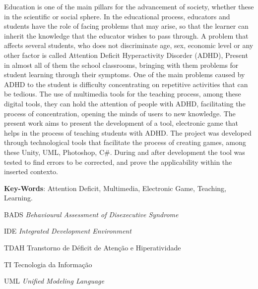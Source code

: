 \documentclass[
	12pt,				%
    oneside,			%
	a4paper,			%
	english,			%
	french,				%
	spanish,			%
	brazil,				%
	]{abntex2}
\begin{document}
\begin{resumo}[Abstract]
	
	Education is one of the main pillars for the advancement of society, whether these in the scientific or social sphere. In the educational process, educators and students have the role of facing problems that may arise, so that the learner can inherit the knowledge that the educator wishes to pass through. A problem that affects several students, who does not discriminate age, sex, economic level or any other factor is called Attention Deficit Hyperactivity Disorder (ADHD), Present in almost all of them the school classrooms, bringing with them problems for student learning through their symptoms. One of the main problems caused by ADHD to the student is difficulty concentrating on repetitive activities that can be tedious. The use of multimedia tools for the teaching process, among these digital tools, they can hold the attention of people with ADHD, facilitating the process of concentration, opening the minds of users to new knowledge. The present work aims to present the development of a tool, electronic game that helps in the process of teaching students with ADHD. The project was developed through technological tools that facilitate the process of creating games, among these Unity, UML, Photoshop, C\#. During and after development the tool was tested to find errors to be corrected, and prove the applicability within the inserted contexto.
	\vspace{\onelineskip}
	
	\noindent
	\textbf{Key-Words}: Attention Deficit, Multimedia, Electronic Game, Teaching, Learning.

\end{resumo}



\listoffigures* %
\cleardoublepage %


\listoftables*
\cleardoublepage

\begin{siglas}
	\item[BADS] \textit{Behavioural Assessment of Disexecutive Syndrome}
	\item[IDE] \textit{Integrated Development Environment}
	\item[TDAH] Transtorno de Déficit de Atenção e Hiperatividade
	\item[TI] Tecnologia da Informação
	\item[UML] \textit{Unified Modeling Language}
\end{siglas}
\end{document}
